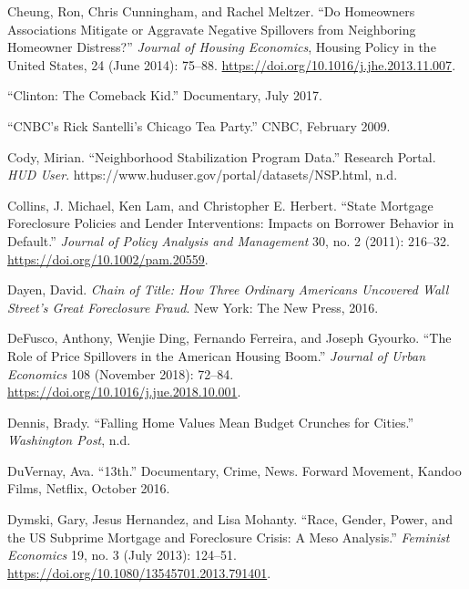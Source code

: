 \documentclass[12pt,oneside]{psthesis}
\begin{document}
\leavevmode\hypertarget{ref-cheung2014homeowners}{}%
Cheung, Ron, Chris Cunningham, and Rachel Meltzer. ``Do Homeowners Associations Mitigate or Aggravate Negative Spillovers from Neighboring Homeowner Distress?'' \emph{Journal of Housing Economics}, Housing Policy in the United States, 24 (June 2014): 75--88. \url{https://doi.org/10.1016/j.jhe.2013.11.007}.

\leavevmode\hypertarget{ref-albright2017clinton}{}%
``Clinton: The Comeback Kid.'' Documentary, July 2017.

\leavevmode\hypertarget{ref-santelli2009cnbc}{}%
``CNBC's Rick Santelli's Chicago Tea Party.'' CNBC, February 2009.

\leavevmode\hypertarget{ref-cody2010neighborhood}{}%
Cody, Mirian. ``Neighborhood Stabilization Program Data.'' Research Portal. \emph{HUD User}. https://www.huduser.gov/portal/datasets/NSP.html, n.d.

\leavevmode\hypertarget{ref-collins2011state}{}%
Collins, J. Michael, Ken Lam, and Christopher E. Herbert. ``State Mortgage Foreclosure Policies and Lender Interventions: Impacts on Borrower Behavior in Default.'' \emph{Journal of Policy Analysis and Management} 30, no. 2 (2011): 216--32. \url{https://doi.org/10.1002/pam.20559}.

\leavevmode\hypertarget{ref-dayenChainTitleHow2016}{}%
Dayen, David. \emph{Chain of Title: How Three Ordinary Americans Uncovered Wall Street's Great Foreclosure Fraud}. New York: The New Press, 2016.

\leavevmode\hypertarget{ref-defusco2018role}{}%
DeFusco, Anthony, Wenjie Ding, Fernando Ferreira, and Joseph Gyourko. ``The Role of Price Spillovers in the American Housing Boom.'' \emph{Journal of Urban Economics} 108 (November 2018): 72--84. \url{https://doi.org/10.1016/j.jue.2018.10.001}.

\leavevmode\hypertarget{ref-dennis2011falling}{}%
Dennis, Brady. ``Falling Home Values Mean Budget Crunches for Cities.'' \emph{Washington Post}, n.d.

\leavevmode\hypertarget{ref-duvernay201613th}{}%
DuVernay, Ava. ``13th.'' Documentary, Crime, News. Forward Movement, Kandoo Films, Netflix, October 2016.

\leavevmode\hypertarget{ref-dymski2013race}{}%
Dymski, Gary, Jesus Hernandez, and Lisa Mohanty. ``Race, Gender, Power, and the US Subprime Mortgage and Foreclosure Crisis: A Meso Analysis.'' \emph{Feminist Economics} 19, no. 3 (July 2013): 124--51. \url{https://doi.org/10.1080/13545701.2013.791401}.
\end{document}
